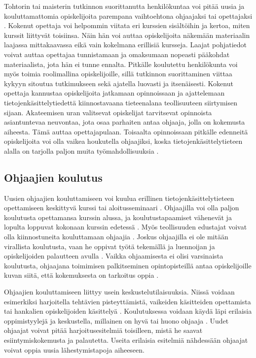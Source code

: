 \documentclass[finnish]{tktltiki2}
\theoremstyle{definition}
\theoremstyle{remark}
\begin{document}
Tohtorin tai maisterin tutkinnon suorittanutta henkilökuntaa voi pitää uusia ja kouluttamattomia opiskelijoita parempana vaihtoehtona ohjaajaksi tai opettajaksi \cite{Baldwin00}. Kokenut opettaja voi helpommin viitata eri kurssien sisältöihin ja kertoa, miten kurssit liittyvät toisiinsa. Näin hän voi auttaa opiskelijoita näkemään materiaalin laajassa mittakaavassa eikä vain kokelmana erillisiä kursseja. Laajat pohjatiedot voivat auttaa opettajaa tunnistamaan ja omaksumaan nopeasti pääkohdat materiaalista, jota hän ei tunne ennalta. Pitkälle koulutettu henkilökunta voi myös toimia roolimallina opiskelijoille, sillä tutkinnon suorittaminen viittaa kykyyn sitoutua tutkimukseen sekä ajatella luovasti ja itsenäisesti. Kokenut opettaja kannustaa opiskelijoita jatkamaan opinnoissaan ja ajattelemaan tietojenkäsittelytiedettä kiinnostavaana tieteenalana teollisuuteen siirtymisen sijaan. Akateemisen uran valitsevat opiskelijat tarvitsevat opinnoista asiantuntevaa neuvontaa, jota osaa parhaiten antaa ohjaaja, jolla on kokemusta aiheesta. Tämä auttaa opettajapulaan. Toisaalta opinnoissaan pitkälle edenneitä opiskelijoita voi olla vaikea houkutella ohjaajiksi, koska tietojenkäsittelytieteen alalla on tarjolla paljon muita työmahdollisuuksia \cite{Kay98}.  \par


\subsection{Ohjaajien koulutus}

Uusien ohjaajien kouluttamiseen voi kuulua erillinen tietojenkäsittelytieteen opettamiseen keskittyvä kurssi \cite{Reges88, Roberts95} tai aloitusseminaari \cite{Sperry08}. Ohjaajilla voi olla paljon koulutusta opettamansa kurssin alussa, ja koulutustapaamiset vähenevät ja lopulta loppuvat kokonaan kurssin edetessä \cite{Roberts95}. Myös teollisuuden edustajat voivat olla kiinnostuneita kouluttamaan ohjaajia \cite{Morgan02}. Joskus ohjaajilla ei ole mitään virallista koulutusta, vaan he oppivat työtä tekemällä ja luennoijan ja opiskelijoiden palautteen avulla \cite{Shannon98, Vihavainen}. Vaikka ohjaamisesta ei olisi varsinaista koulutusta, ohjaajana toimimisen palkitseminen opintopisteillä antaa opiskelijoille kuvan siitä, että kokemuksesta on tarkoitus oppia \cite{Vikberg}. \par

Ohjaajien kouluttamiseen liittyy usein keskustelutilaisuuksia. Niissä voidaan esimerkiksi harjoitella tehtävien pisteyttämistä, vaikeiden käsitteiden opettamista tai hankalien opiskelijoiden käsittelyä \cite{Reges03}. Koulutuksessa voidaan käydä läpi erilaisia oppimistyylejä ja keskustella, millainen on hyvä tai huono ohjaaja \cite{Kay95}. Uudet ohjaajat voivat pitää harjoitusesitelmiä toisilleen, mistä he saavat esiintymiskokemusta ja palautetta. Useita erilaisia esitelmiä nähdessään ohjaajat voivat oppia uusia lähestymistapoja aiheeseen.  \par
\end{document}
